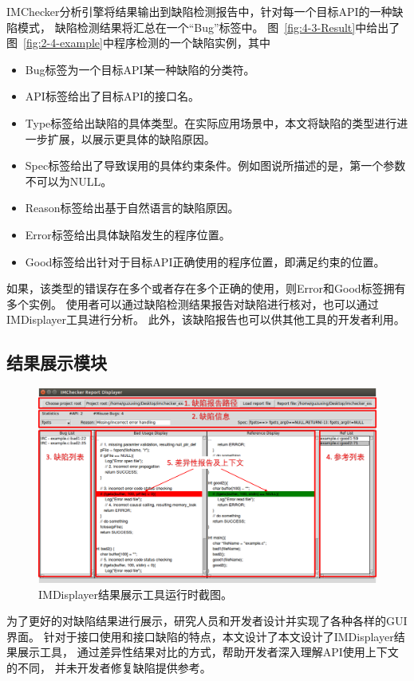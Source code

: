 IMChecker分析引擎将结果输出到缺陷检测报告中，针对每一个目标API的一种缺陷模式，
缺陷检测结果将汇总在一个“Bug”标签中。
图~\ref{fig:4-3-Result}中给出了图~\ref{fig:2-4-example}中程序检测的一个缺陷实例，其中
\begin{itemize}
	\item Bug标签为一个目标API某一种缺陷的分类符。
	\item API标签给出了目标API的接口名。
	\item Type标签给出缺陷的具体类型。在实际应用场景中，本文将缺陷的类型进行进一步扩展，以展示更具体的缺陷原因。
	\item Spec标签给出了导致误用的具体约束条件。例如图说所描述的是，第一个参数不可以为NULL。
	\item Reason标签给出基于自然语言的缺陷原因。
	\item Error标签给出具体缺陷发生的程序位置。
	\item Good标签给出针对于目标API正确使用的程序位置，即满足约束的位置。
\end{itemize}
如果，该类型的错误存在多个或者存在多个正确的使用，则Error和Good标签拥有多个实例。
使用者可以通过缺陷检测结果报告对缺陷进行核对，也可以通过IMDisplayer工具进行分析。
此外，该缺陷报告也可以供其他工具的开发者利用。


\subsection{结果展示模块}
\begin{figure}[t]
	\centering
	\includegraphics[width=0.85\linewidth]{figures/cp4-IMDisplayer.png}
	\caption{
		IMDisplayer结果展示工具运行时截图。
	}
	\label{fig:4-3-IMDisplayer}
\end{figure}

为了更好的对缺陷结果进行展示，研究人员和开发者设计并实现了各种各样的GUI界面。
针对于接口使用和接口缺陷的特点，本文设计了本文设计了IMDisplayer结果展示工具，
通过差异性结果对比的方式，帮助开发者深入理解API使用上下文的不同，
并未开发者修复缺陷提供参考。

